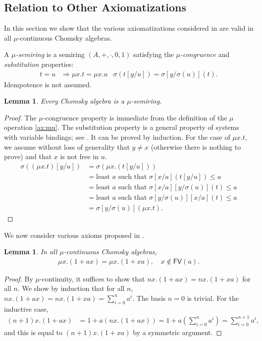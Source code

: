 \documentclass[copyright,creativecommons]{eptcs}
\newtheorem{lemma}[theorem]{Lemma}
\theoremstyle{remark}
\newcommand\subst[2]{[#1/#2]}
\newcommand\rebind[2]{[#1/#2]}
\newcommand\Imp{\mathrel\Rightarrow}
\newcommand\mathname[1]{\ensuremath{\mathsf{#1}}}
\newcommand\FV[1]{\mathname{FV}(#1)}
\begin{document}
\subsection{Relation to Other Axiomatizations}

In this section we show that the various axiomatizations considered in \cite{esle2002,EsikLeiss05,leiss92b} are valid in all $\mu$-continuous Chomsky algebras.

A \emph{$\mu$-semiring} \cite{EsikLeiss05} is a semiring $(A,+,\cdot,0,1)$ satisfying the \emph{$\mu$-congruence} and \emph{substitution} properties:
\begin{align*}
t=u &\Imp \mu x.t=\mu x.u & \sigma(t\subst yu) = \sigma\rebind y{\sigma(u)}(t).
\end{align*}
    Idempotence is not assumed.
\begin{lemma}\label{lem:chomskyismusemi}
    Every Chomsky algebra is a $\mu$-semiring.
\end{lemma}
\begin{proof}
    The $\mu$-congruence property is immediate from the definition of the $\mu$ operation \eqref{ax:mu}. 
    The substitution property is a general property of systems with variable bindings; see \cite[Lemma 5.1.5]{Barendregt84}. It can be proved by induction. For the case of $\mu x.t$, we assume without loss of generality that $y\neq x$ (otherwise there is nothing to prove) and that $x$ is not free in $u$.
\begin{align*}
\sigma((\mu x.t)\subst yu) &= \sigma(\mu x.(t\subst yu))\\
&= \text{least $a$ such that $\sigma\rebind xa(t\subst yu) \leq a$}\\
&= \text{least $a$ such that $\sigma\rebind xa\rebind y{\sigma(u)}(t) \leq a$}\\
&= \text{least $a$ such that $\sigma\rebind y{\sigma(u)}\rebind xa(t) \leq a$}\\
&= \sigma\rebind y{\sigma(u)}(\mu x.t).
\end{align*}
\end{proof}

We now consider various axioms proposed in \cite{leiss92b}.

\begin{lemma}\label{lem:samelists}
In all $\mu$-continuous Chomsky algebras,
\begin{align*}
\mu x.(1+ax) = \mu x.(1+xa),\quad x\not\in\FV a.
\end{align*}
\end{lemma}
\begin{proof}
By $\mu$-continuity, it suffices to show that $nx.(1+ax)=nx.(1+xa)$ for all
$n$. We show by induction that for all $n$, $nx.(1+ax)=nx.(1+xa)=\sum_{i=0}^n a^i$.
The basis $n=0$ is trivial. For the inductive case,
\begin{align*}
(n{+}1)x.(1+ax) &= 1+a(nx.(1+ax)) 
= 1+a(\textstyle\sum_{i=0}^na^i) 
= \textstyle\sum_{i=0}^{n+1}a^i,
\end{align*}
and this is equal to $(n{+}1)x.(1+xa)$ by a symmetric argument.
\end{proof}
\end{document}
